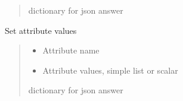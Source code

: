 \documentclass[letterpaper,10pt,english]{sphinxmanual}
\begin{document}
\begin{fulllineitems}
\begin{fulllineitems}
\begin{quote}
\begin{description}
\sphinxAtStartPar
dictionary for json answer

\end{description}\end{quote}

\end{fulllineitems}


\begin{fulllineitems}
\label{\detokenize{webserverdocs:HardwareBaseClass.HardwareBaseDevice.set_attribute}}
\pysigstartsignatures
{}
\pysigstopsignatures
\sphinxAtStartPar
Set attribute values
\begin{quote}\begin{description}
\begin{itemize}
\item {} 
\sphinxAtStartPar
{} \textendash{} Attribute name

\item {} 
\sphinxAtStartPar
{} \textendash{} Attribute values, simple list or scalar

\end{itemize}

\sphinxAtStartPar
dictionary for json answer

\end{description}\end{quote}

\end{fulllineitems}


\end{fulllineitems}

\end{document}
